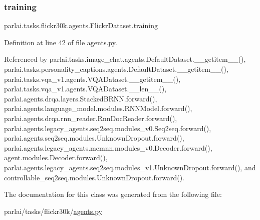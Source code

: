 \mbox{\label{classparlai_1_1tasks_1_1flickr30k_1_1agents_1_1FlickrDataset_a6a5e2312197fc52f45f0d036da16b788}} 
\subsubsection{\texorpdfstring{training}{training}}
{\footnotesize\ttfamily parlai.\+tasks.\+flickr30k.\+agents.\+Flickr\+Dataset.\+training}



Definition at line 42 of file agents.\+py.



Referenced by parlai.\+tasks.\+image\+\_\+chat.\+agents.\+Default\+Dataset.\+\_\+\+\_\+getitem\+\_\+\+\_\+(), parlai.\+tasks.\+personality\+\_\+captions.\+agents.\+Default\+Dataset.\+\_\+\+\_\+getitem\+\_\+\+\_\+(), parlai.\+tasks.\+vqa\+\_\+v1.\+agents.\+V\+Q\+A\+Dataset.\+\_\+\+\_\+getitem\+\_\+\+\_\+(), parlai.\+tasks.\+vqa\+\_\+v1.\+agents.\+V\+Q\+A\+Dataset.\+\_\+\+\_\+len\+\_\+\+\_\+(), parlai.\+agents.\+drqa.\+layers.\+Stacked\+B\+R\+N\+N.\+forward(), parlai.\+agents.\+language\+\_\+model.\+modules.\+R\+N\+N\+Model.\+forward(), parlai.\+agents.\+drqa.\+rnn\+\_\+reader.\+Rnn\+Doc\+Reader.\+forward(), parlai.\+agents.\+legacy\+\_\+agents.\+seq2seq.\+modules\+\_\+v0.\+Seq2seq.\+forward(), parlai.\+agents.\+seq2seq.\+modules.\+Unknown\+Dropout.\+forward(), parlai.\+agents.\+legacy\+\_\+agents.\+memnn.\+modules\+\_\+v0.\+Decoder.\+forward(), agent.\+modules.\+Decoder.\+forward(), parlai.\+agents.\+legacy\+\_\+agents.\+seq2seq.\+modules\+\_\+v1.\+Unknown\+Dropout.\+forward(), and controllable\+\_\+seq2seq.\+modules.\+Unknown\+Dropout.\+forward().



The documentation for this class was generated from the following file\+:\begin{DoxyCompactItemize}
\item 
parlai/tasks/flickr30k/\hyperlink{parlai_2tasks_2flickr30k_2agents_8py}{agents.\+py}\end{DoxyCompactItemize}
